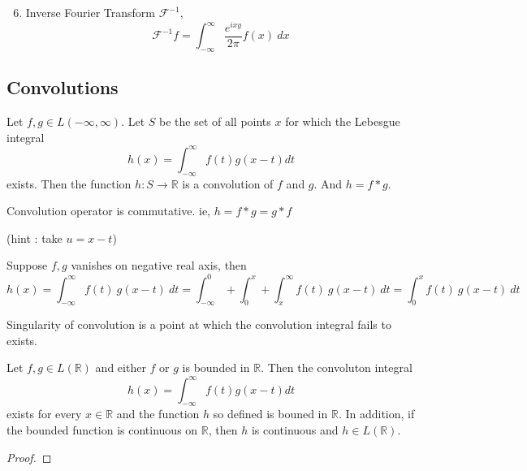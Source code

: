 \begin{enumerate}
	\setcounter{enumi}{5}
	\item Inverse Fourier Transform $\mathscr{F}^{-1}$,
		\[ \mathscr{F}^{-1}f = \int_{-\infty}^\infty \frac{e^{ixy}}{2\pi}f(x)\ dx \]
\end{enumerate}

\subsection{Convolutions}
\begin{definition}
	Let \( f,g \in L(-\infty,\infty) \).
	Let $S$ be the set of all points $x$ for which the Lebesgue integral
	\[ h(x) = \int_{-\infty}^\infty f(t) g(x-t) dt \]
	exists.
	Then the function \( h : S \to \mathbb{R} \) is a convolution of $f$ and $g$.
	And \( h = f \ast g \).
\end{definition}

\begin{remark}
	Convolution operator is commutative.
	ie, \( h = f \ast g = g \ast f \)
	\begin{commentary}
		(hint : take $u = x-t$)
	\end{commentary}
\end{remark}

\begin{remark}
	Suppose $f,g$ vanishes on negative real axis, then
	\[ h(x) = \int_{-\infty}^\infty f(t)\ g(x-t)\ dt = \int_{-\infty}^0 + \int_0^x  + \int_x^\infty f(t)\ g(x-t)\ dt = \int_0^x f(t)\ g(x-t)\ dt \] 
\end{remark}

\begin{remark}
	Singularity of convolution is a point at which the convolution integral fails to exists.
\end{remark}

\begin{theorem}
	Let \( f,g \in L(\mathbb{R}) \) and either $f$ or $g$ is bounded in $\mathbb{R}$.
	Then the convoluton integral
	\[ h(x) = \int_{-\infty}^\infty f(t) g(x-t) dt \]
	exists for every \( x \in \mathbb{R} \) and the function $h$ so defined is bouned in $\mathbb{R}$.
	In addition, if the bounded function is continuous on $\mathbb{R}$, then $h$ is continuous and \( h \in L(\mathbb{R}) \).
\end{theorem}
\begin{synopsis}
\end{synopsis}
\begin{proof}
\end{proof}

